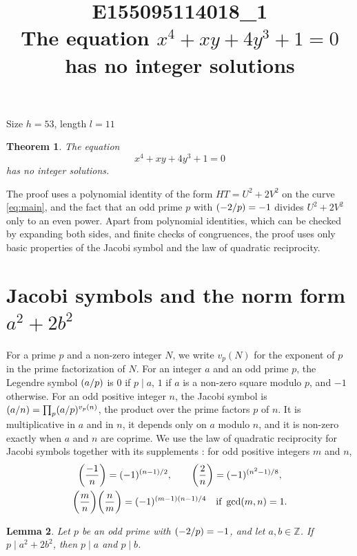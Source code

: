 \documentclass[11pt]{article}
\title{\textbf{E155095114018\_1}\\[4pt] {\Large The equation $x^{4}+xy+4y^{3}+1=0$ has no integer solutions}}
\author{}
\date{}
\newtheorem{theorem}{Theorem}
\newtheorem{lemma}[theorem]{Lemma}
\newcommand{\Z}{\mathbb{Z}}
\newcommand{\leg}[2]{\mathchoice{\biggl(\dfrac{#1}{#2}\biggr)}{(#1/#2)}{(#1/#2)}{(#1/#2)}}
\begin{document}
\maketitle
\vspace{-8ex}
\begin{center}
Size $h=53$, length $l=11$
\end{center}

\begin{theorem}\label{thm:main}
The equation
\begin{equation}\label{eq:main}
x^{4}+xy+4y^{3}+1=0
\end{equation}
has no integer solutions.
\end{theorem}

The proof uses a polynomial identity of the form $HT=U^2+2V^2$ on the curve \eqref{eq:main}, and the fact that an odd prime $p$ with $\leg{-2}{p}=-1$ divides $U^2+2V^2$ only to an even power. Apart from polynomial identities, which can be checked by expanding both sides, and finite checks of congruences, the proof uses only basic properties of the Jacobi symbol and the law of quadratic reciprocity.

\section{\texorpdfstring{Jacobi symbols and the norm form $a^2+2b^2$}{Jacobi symbols and the norm form}}

For a prime $p$ and a non-zero integer $N$, we write $v_p(N)$ for the exponent of $p$ in the prime factorization of $N$. For an integer $a$ and an odd prime $p$, the Legendre symbol $\leg{a}{p}$ is $0$ if $p\mid a$, $1$ if $a$ is a non-zero square modulo $p$, and $-1$ otherwise. For an odd positive integer $n$, the Jacobi symbol is $\leg{a}{n}=\prod_p\leg{a}{p}^{v_p(n)}$, the product over the prime factors $p$ of $n$. It is multiplicative in $a$ and in $n$, it depends only on $a$ modulo $n$, and it is non-zero exactly when $a$ and $n$ are coprime. We use the law of quadratic reciprocity for Jacobi symbols together with its supplements \cite[Chapter~5, \S2]{IR}: for odd positive integers $m$ and $n$,
\begin{gather*}
\leg{-1}{n}=(-1)^{(n-1)/2},\qquad\leg{2}{n}=(-1)^{(n^2-1)/8},\\
\leg{m}{n}\leg{n}{m}=(-1)^{(m-1)(n-1)/4}\quad\text{if }\gcd(m,n)=1.
\end{gather*}

\begin{lemma}\label{lem:divides}
Let $p$ be an odd prime with $\leg{-2}{p}=-1$, and let $a,b\in\Z$. If $p\mid a^2+2b^2$, then $p\mid a$ and $p\mid b$.
\end{lemma}
\end{document}
